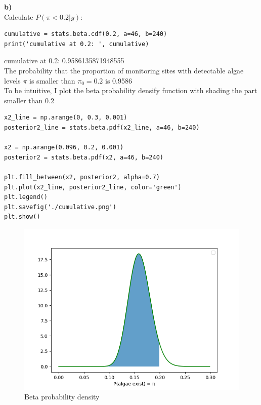 \documentclass{article}
\begin{document}
\textbf{b)}\\
Calculate $P(\pi<0.2|y)$:
\begin{verbatim}   
cumulative = stats.beta.cdf(0.2, a=46, b=240)
print('cumulative at 0.2: ', cumulative)
\end{verbatim}
cumulative at 0.2:  0.9586135871948555\\

The probability that the proportion of monitoring sites with detectable algae levels $\pi$ is smaller than $\pi_0=0.2$ is 0.9586\\

To be intuitive, I plot the beta probability densify function with shading the part smaller than 0.2\\

\begin{verbatim}   
x2_line = np.arange(0, 0.3, 0.001)
posterior2_line = stats.beta.pdf(x2_line, a=46, b=240)

x2 = np.arange(0.096, 0.2, 0.001)
posterior2 = stats.beta.pdf(x2, a=46, b=240)

plt.fill_between(x2, posterior2, alpha=0.7)
plt.plot(x2_line, posterior2_line, color='green')
plt.legend()
plt.savefig('./cumulative.png')
plt.show()
\end{verbatim}

\begin{figure}[H]
\centering  
\includegraphics[scale=0.6]{cumulative.png}
\caption{Beta probability density}
\label{fig: label}
\end{figure}
\end{document}
